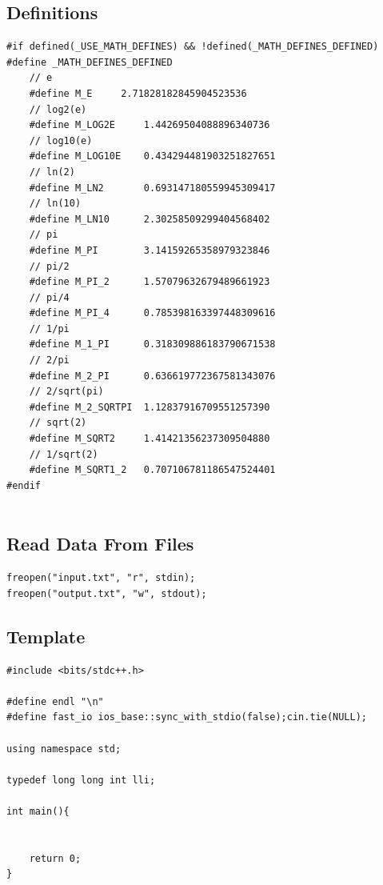 \documentclass[twoside]{article}
\begin{document}
\begin{multicols*}{2}
\subsection*{Definitions}
\begin{verbatim}
#if defined(_USE_MATH_DEFINES) && !defined(_MATH_DEFINES_DEFINED)
#define _MATH_DEFINES_DEFINED
	// e
	#define M_E		2.71828182845904523536
	// log2(e)
	#define M_LOG2E		1.44269504088896340736
	// log10(e)
	#define M_LOG10E	0.434294481903251827651
	// ln(2)
	#define M_LN2		0.693147180559945309417
	// ln(10)
	#define M_LN10		2.30258509299404568402
	// pi
	#define M_PI		3.14159265358979323846
	// pi/2
	#define M_PI_2		1.57079632679489661923
	// pi/4
	#define M_PI_4		0.785398163397448309616
	// 1/pi
	#define M_1_PI	 	0.318309886183790671538
	// 2/pi
	#define M_2_PI		0.636619772367581343076
	// 2/sqrt(pi)
	#define M_2_SQRTPI	1.12837916709551257390
	// sqrt(2)
	#define M_SQRT2		1.41421356237309504880
	// 1/sqrt(2)
	#define M_SQRT1_2	0.707106781186547524401
#endif


\end{verbatim}

\subsectionfont{\large\bfseries\sffamily\underline}
\subsection*{Read Data From Files}
\begin{verbatim}
freopen("input.txt", "r", stdin);
freopen("output.txt", "w", stdout);

\end{verbatim}

\subsectionfont{\large\bfseries\sffamily\underline}
\subsection*{Template}
\begin{verbatim}
#include <bits/stdc++.h>

#define endl "\n"
#define fast_io ios_base::sync_with_stdio(false);cin.tie(NULL);

using namespace std;

typedef long long int lli;

int main(){


	return 0;
}
\end{verbatim}


    \end{multicols*}
    
\end{document}
